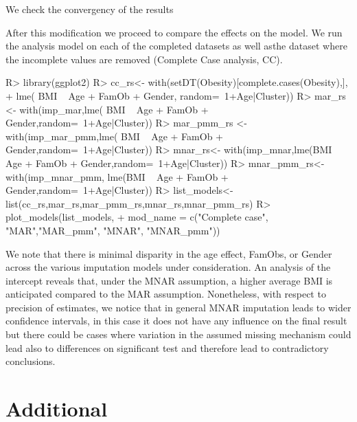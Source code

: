 \documentclass[
]{jss}
\begin{document}
We check the convergency of the results

\begin{CodeChunk}
\end{CodeChunk}

After this modification we proceed to compare the effects on the model.
We run the analysis model on each of the completed datasets as well
asthe dataset where the incomplete values are removed (Complete Case
analysis, CC).

\begin{CodeChunk}
\begin{CodeInput}
R> library(ggplot2)
R> cc_rs<- with(setDT(Obesity)[complete.cases(Obesity),],
+              lme( BMI ~ Age + FamOb + Gender, random=~1+Age|Cluster))
R> mar_rs <- with(imp_mar,lme( BMI ~ Age + FamOb + Gender,random=~1+Age|Cluster))
R> mar_pmm_rs <- with(imp_mar_pmm,lme( BMI ~ Age + FamOb + Gender,random=~1+Age|Cluster))
R> mnar_rs<- with(imp_mnar,lme(BMI ~ Age + FamOb + Gender,random=~1+Age|Cluster))
R> mnar_pmm_rs<- with(imp_mnar_pmm, lme(BMI ~ Age + FamOb + Gender,random=~1+Age|Cluster))
R> list_models<-list(cc_rs,mar_rs,mar_pmm_rs,mnar_rs,mnar_pmm_rs)
R> plot_models(list_models,
+             mod_name = c("Complete case", "MAR","MAR_pmm", "MNAR", "MNAR_pmm"))
\end{CodeInput}
\end{CodeChunk}

We note that there is minimal disparity in the age effect, FamObs, or
Gender across the various imputation models under consideration. An
analysis of the intercept reveals that, under the MNAR assumption, a
higher average BMI is anticipated compared to the MAR assumption.
Nonetheless, with respect to precision of estimates, we notice that in
general MNAR imputation leads to wider confidence intervals, in this
case it does not have any influence on the final result but there could
be cases where variation in the assumed missing mechanism could lead
also to differences on significant test and therefore lead to
contradictory conclusions.

\hypertarget{additional}{%
\section{Additional}\label{additional}}
\end{document}
